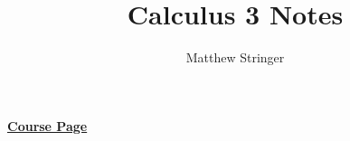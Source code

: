 \documentclass[12pt]{article}
\title{Calculus 3 Notes} %
\date{}
\author{Matthew Stringer} %
\begin{document}
\maketitle
\href{https://ocw.mit.edu/courses/mathematics/18-02sc-multivariable-calculus-fall-2010/index.htm}{\textbf{Course Page}}
\tableofcontents
\newpage

% 
% 
% 

\end{document}
